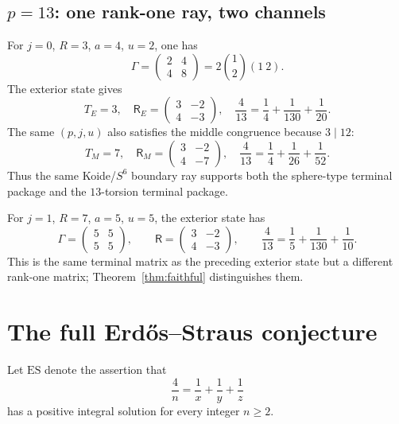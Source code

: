 \documentclass[11pt]{article}
\theoremstyle{definition}
\theoremstyle{remark}
\begin{document}
\subsection{\texorpdfstring{$p=13$: one rank-one ray, two channels}{p=13: one rank-one ray, two channels}}
For $j=0$, $R=3$, $a=4$, $u=2$, one has
\[
 \Gamma=\begin{pmatrix}2&4\\4&8\end{pmatrix}
 =2\binom12(1\ 2).
\]
The exterior state gives
\[
 T_E=3,
 \quad
 \mathsf R_E=\begin{pmatrix}3&-2\\4&-3\end{pmatrix},
 \quad
 \frac4{13}=\frac14+\frac1{130}+\frac1{20}.
\]
The same $(p,j,u)$ also satisfies the middle congruence because $3\mid12$:
\[
 T_M=7,
 \quad
 \mathsf R_M=\begin{pmatrix}3&-2\\4&-7\end{pmatrix},
 \quad
 \frac4{13}=\frac14+\frac1{26}+\frac1{52}.
\]
Thus the same Koide/$S^6$ boundary ray supports both the sphere-type terminal
package and the $13$-torsion terminal package.

For $j=1$, $R=7$, $a=5$, $u=5$, the exterior state has
\[
 \Gamma=\begin{pmatrix}5&5\\5&5\end{pmatrix},
 \qquad
 \mathsf R=\begin{pmatrix}3&-2\\4&-3\end{pmatrix},
 \qquad
 \frac4{13}=\frac15+\frac1{130}+\frac1{10}.
\]
This is the same terminal matrix as the preceding exterior state but a
different rank-one matrix; Theorem~\ref{thm:faithful} distinguishes them.


\section{The full Erd\H{o}s--Straus conjecture}

Let \(\mathrm{ES}\) denote the assertion that
\begin{equation}\label{eq:global-ES}
 \frac4n=\frac1x+\frac1y+\frac1z
\end{equation}
has a positive integral solution for every integer \(n\ge2\).
\end{document}
